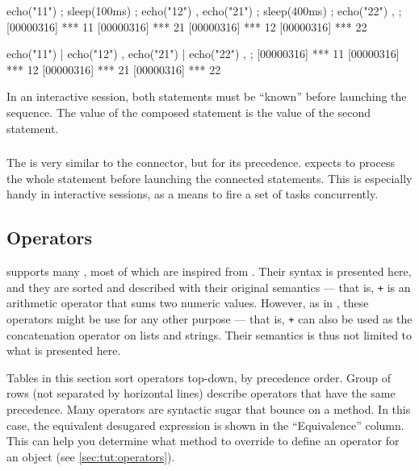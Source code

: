 \begin{urbiscript}
{
  { echo("11") ; sleep(100ms) ; echo("12") },
  { echo("21") ; sleep(400ms) ; echo("22") },
};
[00000316] *** 11
[00000316] *** 21
[00000316] *** 12
[00000316] *** 22
\end{urbiscript}

\begin{urbiscript}
{
  { echo("11") | echo("12") },
  { echo("21") | echo("22") },
};
[00000316] *** 11
[00000316] *** 12
[00000316] *** 21
[00000316] *** 22
\end{urbiscript}

In an interactive session, both statements must be ``known'' before
launching the sequence.  The value of the composed statement is the
value of the second statement.

\subsubsection{\samp{\&}}

The \samp{\&} is very similar to the \samp{,} connector, but for its
precedence.  \urbi expects to process the whole statement before
launching the connected statements.   This is especially handy in
interactive sessions, as a means to fire a set of tasks concurrently.


\subsection{Operators}

\us supports many , most of which are inspired from
\Cxx. Their syntax is presented here, and they are sorted and
described with their original semantics --- that is, \lstinline|+| is
an arithmetic operator that sums two numeric values. However, as in
\Cxx, these operators might be use for any other purpose --- that is,
\lstinline|+| can also be used as the concatenation operator on lists
and strings. Their semantics is thus not limited to what is presented
here.

Tables in this section sort operators top-down, by precedence order.
Group of rows (not separated by horizontal lines) describe operators
that have the same precedence. Many operators are syntactic sugar that
bounce on a method. In this case, the equivalent desugared expression
is shown in the ``Equivalence'' column. This can help you determine
what method to override to define an operator for an object (see
\autoref{sec:tut:operators}).

